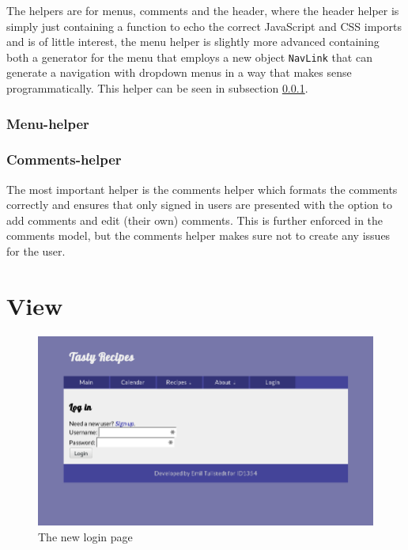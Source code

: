 \documentclass[a4paper]{scrartcl}
\begin{document}
The helpers are for menus, comments and the header, where the header helper is simply just containing a function to echo the correct JavaScript and CSS imports and is of little interest, the menu helper is slightly more advanced containing both a generator for the menu that employs a new object \texttt{NavLink} that can generate a navigation with dropdown menus in a way that makes sense programmatically. This helper can be seen in subsection \ref{subsub:Menu-helper}.

\subsubsection{Menu-helper}
\label{subsub:Menu-helper}


\subsubsection{Comments-helper}
\label{subsub:commentshelper}
The most important helper is the comments helper which formats the comments correctly and ensures that only signed in users are presented with the option to add comments and edit (their own) comments. This is further enforced in the comments model, but the comments helper makes sure not to create any issues for the user.



\section{View}

\begin{figure}[!h]
  \begin{center}
    \includegraphics[scale=0.3]{login.png}
    \caption{The new login page}
    \label{fig:login}
  \end{center}
\end{figure}
\end{document}

